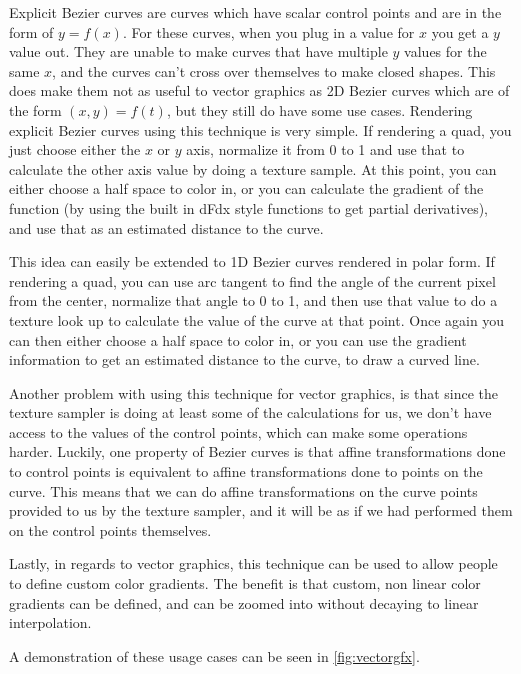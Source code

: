 \documentclass{jcgt}
\begin{document}
Explicit Bezier curves are curves which have scalar control points and are in the form of $y=f(x)$.  For these curves, when you plug in a value for $x$ you get a $y$ value out.  They are unable to make curves that have multiple $y$ values for the same $x$, and the curves can't cross over themselves to make closed shapes.  This does make them not as useful to vector graphics as 2D Bezier curves which are of the form $(x,y) = f(t)$, but they still do have some use cases.  Rendering explicit Bezier curves using this technique is very simple.  If rendering a quad, you just choose either the $x$ or $y$ axis, normalize it from 0 to 1 and use that to calculate the other axis value by doing a texture sample.  At this point, you can either choose a half space to color in, or you can calculate the gradient of the function (by using the built in dFdx style functions to get partial derivatives), and use that as an estimated distance to the curve.

This idea can easily be extended to 1D Bezier curves rendered in polar form.  If rendering a quad, you can use arc tangent to find the angle of the current pixel from the center, normalize that angle to 0 to 1, and then use that value to do a texture look up to calculate the value of the curve at that point.  Once again you can then either choose a half space to color in, or you can use the gradient information to get an estimated distance to the curve, to draw a curved line.

Another problem with using this technique for vector graphics, is that since the texture sampler is doing at least some of the calculations for us, we don't have access to the values of the control points, which can make some operations harder.  Luckily, one property of Bezier curves is that affine transformations done to control points is equivalent to affine transformations done to points on the curve.  This means that we can do affine transformations on the curve points provided to us by the texture sampler, and it will be as if we had performed them on the control points themselves.

Lastly, in regards to vector graphics, this technique can be used to allow people to define custom color gradients.  The benefit is that custom, non linear color gradients can be defined, and can be zoomed into without decaying to linear interpolation.

A demonstration of these usage cases can be seen in \autoref{fig:vectorgfx}.

\end{document}
